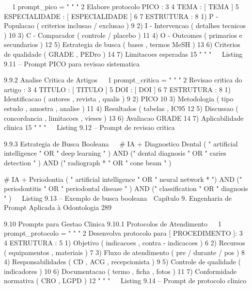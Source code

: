                                                                                          
 1 prompt_pico = " " "
 2 Elabore protocolo PICO :
 3
 4 TEMA : [ TEMA ]
 5 ESPECIALIDADE : [ ESPECIALIDADE ]
 6
 7 ESTRUTURA :
 8 1) P - Populacao ( criterios inclusao / exclusao )
 9 2) I - Intervencao ( detalhes tecnicos )
10 3) C - Comparador ( controle / placebo )
11 4) O - Outcomes ( primarios e secundarios )
12 5) Estrategia de busca ( bases , termos MeSH )
13 6) Criterios de qualidade ( GRADE , PEDro )
14 7) Limitacoes esperadas
15 " " "
                                                                                         
                    Listing 9.11 – Prompt PICO para revisao sistematica


  9.9.2    Analise Critica de Artigos
                                                                                         
 1 prompt_critica = " " "
 2 Revisao critica do artigo :
 3
 4 TITULO : [ TITULO ]
 5 DOI : [ DOI ]
 6
 7 ESTRUTURA :
 8 1) Identificacao ( autores , revista , qualis )
 9 2) PICO
10 3) Metodologia ( tipo estudo , amostra , analise )
11 4) Resultados ( tabelas , IC95 %
12 5) Discussao ( concordancia , limitacoes , vieses )
13 6) Avaliacao GRADE
14 7) Aplicabilidade clinica
15 " " "
                                                                                         
                             Listing 9.12 – Prompt de revisao critica


  9.9.3    Estrategia de Busca Booleana
                                                                                         
  # IA + Diagnostico Dental
  ( " artificial intelligence " OR " deep learning " )
  AND (" dental diagnosis " OR " caries detection " )
  AND (" radiograph * " OR " cone beam " )

  # IA + Periodontia
  ( " artificial intelligence " OR " neural network * ")
  AND (" periodontitis " OR " periodontal disease " )
  AND (" classification " OR " diagnosis " )
                                                                                         
                            Listing 9.13 – Exemplo de busca booleana
  Capítulo 9. Engenharia de Prompt Aplicada à Odontologia               289


  9.10      Prompts para Gestao Clinica
  9.10.1     Protocolos de Atendimento
                                                                             
 1 prompt_protocolo = " " "
 2 Desenvolva protocolo para [ PROCEDIMENTO ]:
 3
 4 ESTRUTURA :
 5 1) Objetivo ( indicacoes , contra - indicacoes )
 6 2) Recursos ( equipamentos , materiais )
 7 3) Fluxo de atendimento ( pre / durante / pos )
 8 4) Responsabilidades ( CD , ACG , recepcionista )
 9 5) Controle de qualidade ( indicadores )
10 6) Documentacao ( termo , ficha , fotos )
11 7) Conformidade normativa ( CRO , LGPD )
12 " " "
                                                                             
                          Listing 9.14 – Prompt de protocolo clinico



